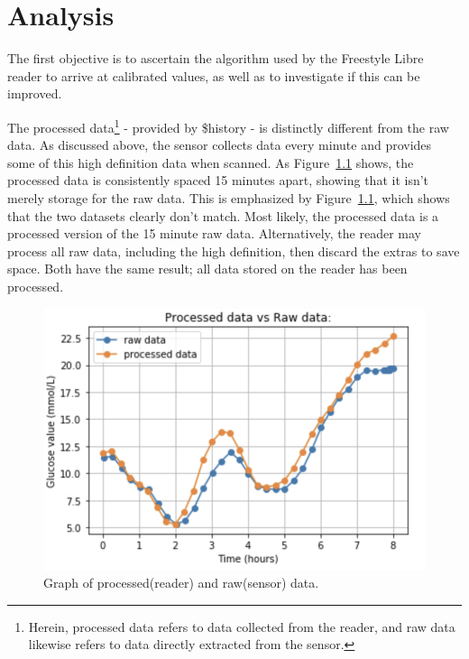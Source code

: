 \chapter{Analysis}

The first objective is to ascertain the algorithm used by the Freestyle Libre reader to arrive at calibrated values, as well as to investigate if this can be improved.

The processed data\footnote{Herein, processed data refers to data collected from the reader, and raw data likewise refers to data directly extracted from the sensor.} - provided by \$history - is distinctly different from the raw  data. As discussed above, the sensor collects data every minute and provides some of this high definition data when scanned. As Figure~\ref{fig:graph3} shows, the processed data is consistently spaced 15 minutes apart, showing that it isn’t merely storage for the raw data. This is emphasized by Figure~\ref{fig:graph3}, which shows that the two datasets clearly don’t match. Most likely, the processed data is a processed version of the 15 minute raw data. Alternatively, the reader may process all raw data, including the high definition, then discard the extras to save space. Both have the same result; all data stored on the reader has been processed.

\begin{figure}[ht]
\centering\includegraphics[width=1.0\linewidth]{images/graph3.png}
\caption{Graph of processed(reader) and raw(sensor) data.}
\label{fig:graph3}
\end{figure}

